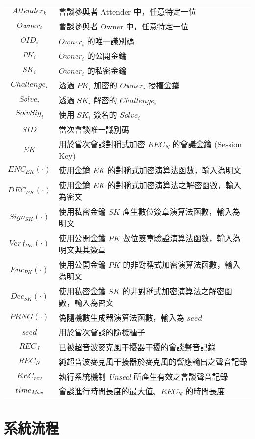 \begin{longtable}{c l}
    $Attender_{k}$  & 會談參與者 Attender 中，任意特定一位 \\
    $Owner_{i}$     & 會談參與者 Owner 中，任意特定一位 \\
    $OID_{i}$       & $Owner_{i}$ 的唯一識別碼 \\
    $PK_{i}$        & $Owner_{i}$ 的公開金鑰 \\
    $SK_{i}$        & $Owner_{i}$ 的私密金鑰 \\
    $Challenge_{i}$ & 透過 $PK_{i}$ 加密的 $Owner_{i}$ 授權金鑰 \\
    $Solve_{i}$     & 透過 $SK_{i}$ 解密的 $Challenge_{i}$ \\
    $SolvSig_{i}$   & 使用 $SK_{i}$ 簽名的 $Solve_{i}$ \\
    $SID$           & 當次會談唯一識別碼 \\
    $EK$            & 用於當次會談對稱式加密 $REC_{N}$ 的會議金鑰 (Session Key) \\
    $ENC_{EK}(·)$   & 使用金鑰 $EK$ 的對稱式加密演算法函數，輸入為明文 \\
    $DEC_{EK}(·)$   & 使用金鑰 $EK$ 的對稱式加密演算法之解密函數，輸入為密文 \\
    $Sign_{SK}(·)$  & 使用私密金鑰 $SK$ 產生數位簽章演算法函數，輸入為明文 \\
    $Verf_{PK}(·)$  & 使用公開金鑰 $PK$ 數位簽章驗證演算法函數，輸入為明文與其簽章 \\
    $Enc_{PK}(·)$   & 使用公開金鑰 $PK$ 的非對稱式加密演算法函數，輸入為明文 \\
    $Dec_{SK}(·)$   & 使用私密金鑰 $SK$ 的非對稱式加密演算法之解密函數，輸入為密文 \\
    $PRNG(·)$       & 偽隨機數生成器演算法函數，輸入為 $seed$  \\
    $seed$          & 用於當次會談的隨機種子 \\
    $REC_{J}$       & 已被超音波麥克風干擾器干擾的會談聲音記錄 \\
    $REC_{N}$       & 純超音波麥克風干擾器於麥克風的響應輸出之聲音記錄 \\
    $REC_{rev}$     & 執行系統機制 {\it Unseal} 所產生有效之會談聲音記錄 \\
    $time_{Max}$    & 會談進行時間長度的最大值、$REC_{N}$ 的時間長度 \\
\end{longtable}


\section{系統流程}

